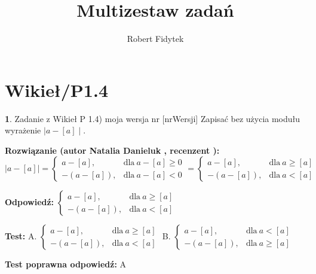 \documentclass[12pt, a4paper]{article}
\title{Multizestaw zadań}
\author{Robert Fidytek}
\date{}
\theoremstyle{definition} %
\newtheorem{zad}{}
\newcommand{\kategoria}[1]{\section{#1}} %
\newcommand{\zadStart}[1]{\begin{zad}#1\newline} %
\newcommand{\zadStop}{\end{zad}}   %
\newcommand{\rozwStart}[2]{\noindent \textbf{Rozwiązanie (autor #1 , recenzent #2): }\newline} %
\newcommand{\rozwStop}{\newline}                                            %
\newcommand{\odpStart}{\noindent \textbf{Odpowiedź:}\newline}    %
\newcommand{\odpStop}{\newline}                                             %
\newcommand{\testStart}{\noindent \textbf{Test:}\newline} %
\newcommand{\testStop}{\newline} %
\newcommand{\kluczStart}{\noindent \textbf{Test poprawna odpowiedź:}\newline} %
\newcommand{\kluczStop}{\newline} %
\begin{document}
\maketitle

\kategoria{Wikieł/P1.4}

\zadStart{Zadanie z Wikieł P 1.4) moja wersja nr [nrWersji]}
Zapisać bez użycia modułu wyrażenie $\mid a - [a] \mid$.
\zadStop

\rozwStart{Natalia Danieluk}{}
$$\mid a - [a] \mid =
\begin{cases} 
a - [a], & \text{dla} \ a - [a] \ge 0 \\
- (a - [a]), & \text{dla}\ a - [a] < 0
\end{cases} 
=
\begin{cases} 
a - [a], & \text{dla} \ a \ge [a] \\
- (a - [a]), & \text{dla}\ a < [a]
\end{cases}
$$
\rozwStop

\odpStart
$
\begin{cases} 
a - [a], & \text{dla} \ a \ge [a] \\
- (a - [a]), & \text{dla}\ a < [a]
\end{cases}
$
\odpStop

\testStart
A. $
\begin{cases} 
a - [a], & \text{dla} \ a \ge [a] \\
- (a - [a]), & \text{dla}\ a < [a]
\end{cases}
$
B. $
\begin{cases} 
a - [a], & \text{dla} \ a < [a] \\
- (a - [a]), & \text{dla}\ a \ge [a]
\end{cases}
$
\testStop

\kluczStart
A
\kluczStop
\end{document}
